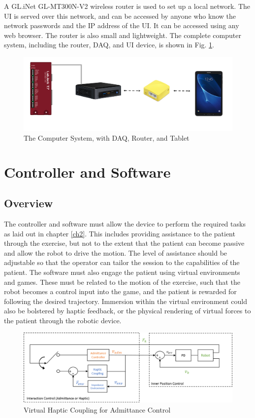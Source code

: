\documentclass[12pt]{report}
\begin{document}
	 
	A GL.iNet GL-MT300N-V2 wireless router is used to set up a local network. The UI is served over this network, and can be accessed by anyone who know the network passwords and the IP address of the UI. It can be accessed using any web browser. The router is also small and lightweight. The complete computer system, including the router, DAQ, and UI device, is shown in Fig. \ref{fig:comp}. 
	


	\begin{figure}[h] 
		\centering
		\includegraphics[width=0.75\linewidth]{computer_system}
		\caption{The Computer System, with DAQ, Router, and Tablet}
		\label{fig:comp}
	\end{figure}
	
	
		
\chapter{Controller and Software} \label{ch3}


	\section{Overview}
	
	The controller and software must allow the device to perform the required tasks as laid out in chapter \ref{ch2}. This includes providing assistance to the patient through the exercise, but not to the extent that the patient can become passive and allow the robot to drive the motion. The level of assistance should be adjustable so that the operator can tailor the session to the capabilities of the patient. The software must also engage the patient using virtual environments and games. These must be related to the motion of the exercise, such that the robot becomes a control input into the game, and the patient is rewarded for following the desired trajectory. Immersion within the virtual environment could also be bolstered by haptic feedback, or the physical rendering of virtual forces to the patient through the robotic device. 
	
	\begin{figure}[h] 
		\centering
		\includegraphics[width=\linewidth]{control_diagram2}
		\caption{Virtual Haptic Coupling for Admittance Control}
		\label{fig:software}
	\end{figure} 
	
\end{document}
